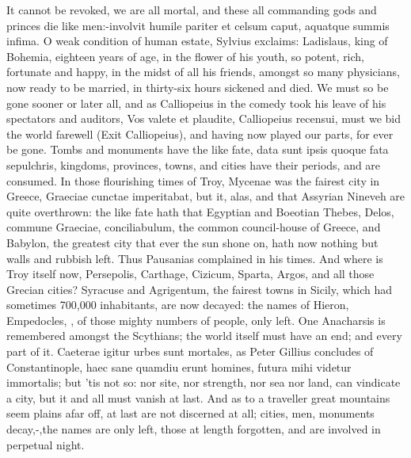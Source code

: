 {It cannot be revoked, we are all mortal, and these all commanding gods
and princes die like men:-involvit humile pariter et celsum
caput, aquatque summis infima. O weak condition of human estate,
Sylvius exclaims: Ladislaus, king of Bohemia, eighteen years of
age, in the flower of his youth, so potent, rich, fortunate and happy,
in the midst of all his friends, amongst so many physicians, now
ready to be  married, in thirty-six hours sickened and died. We
must so be gone sooner or later all, and as Calliopeius in the comedy
took his leave of his spectators and auditors, Vos valete et plaudite,
Calliopeius recensui, must we bid the world farewell (Exit
Calliopeius), and having now played our parts, for ever be gone. Tombs
and monuments have the like fate, data sunt ipsis quoque fata
sepulchris, kingdoms, provinces, towns, and cities have their periods,
and are consumed. In those flourishing times of Troy, Mycenae was the
fairest city in Greece, Graeciae cunctae imperitabat, but it, alas, and
that Assyrian Nineveh are quite overthrown: the like fate hath
that Egyptian and Boeotian Thebes, Delos, commune Graeciae,
conciliabulum, the common council-house of Greece, and Babylon,
the greatest city that ever the sun shone on, hath now nothing but
walls and rubbish left.  Thus Pausanias complained in his times. And where is
Troy itself now, Persepolis, Carthage, Cizicum, Sparta, Argos, and all
those Grecian cities? Syracuse and Agrigentum, the fairest towns in
Sicily, which had sometimes 700,000 inhabitants, are now decayed: the
names of Hieron, Empedocles, \etc{}, of those mighty numbers of people,
only left. One Anacharsis is remembered amongst the Scythians; the
world itself must have an end; and every part of it. Caeterae igitur
urbes sunt mortales, as Peter Gillius concludes of
Constantinople, haec sane quamdiu erunt homines, futura mihi videtur
immortalis; but 'tis not so: nor site, nor strength, nor sea nor land,
can vindicate a city, but it and all must vanish at last. And as to a
traveller great mountains seem plains afar off, at last are not
discerned at all; cities, men, monuments decay,-,the names are only left, those at length
forgotten, and are involved in perpetual night.

}
